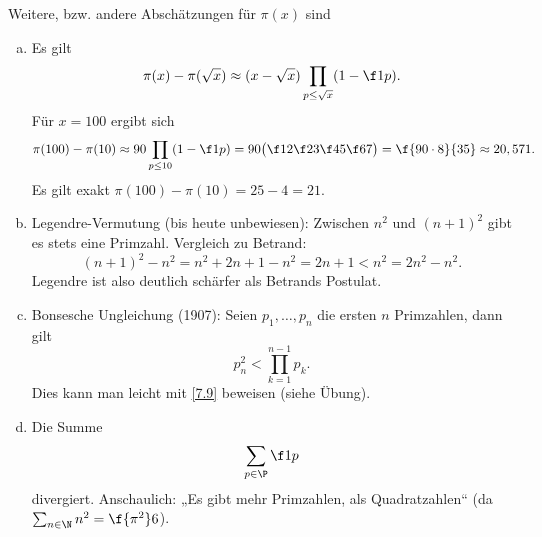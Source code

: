 \begin{nt} \label{7.10}
	Weitere, bzw. andere Abschätzungen für $\pi(x)$ sind
	\begin{enumerate}[a)]
		\item
			Es gilt
			\[
				\pi(x) - \pi(\sqrt x) \approx (x-\sqrt x)\prod_{p \le \sqrt x} (1 - \f 1p).
			\]
			Für $x = 100$ ergibt sich
			\[
				\pi(100) - \pi(10)
				\approx 90 \prod_{p \le 10} (1 - \f 1p)
				= 90 \big( \f 12 \f 23 \f 45 \f 67 \big)
				= \f{90 \cdot 8}{35}
				\approx 20,571.
			\]
			Es gilt exakt $\pi(100) - \pi(10) = 25 - 4 = 21$.
		\item
			Legendre-Vermutung (bis heute unbewiesen):
			Zwischen $n^2$ und $(n+1)^2$ gibt es stets eine Primzahl.
			Vergleich zu Betrand:
			\[
				(n+1)^2 - n^2
				= n^2 + 2n + 1 - n^2
				= 2n + 1
				< n^2 = 2n^2 - n^2.
			\]
			Legendre ist also deutlich schärfer als Betrands Postulat.
		\item
			Bonsesche Ungleichung (1907):
			Seien $p_1, \dotsc, p_n$ die ersten $n$ Primzahlen, dann gilt
			\[
				p_n^2 < \prod_{k=1}^{n-1} p_k.
			\]
			Dies kann man leicht mit \ref{7.9} beweisen (siehe Übung).
		\item
			Die Summe
			\[
				\sum_{p\in\P} \f 1p
			\]
			divergiert.
			Anschaulich: „Es gibt mehr Primzahlen, als Quadratzahlen“ (da $\sum_{n \in \N} n^2 = \f{\pi^2}6$).
	\end{enumerate}
\end{nt}


